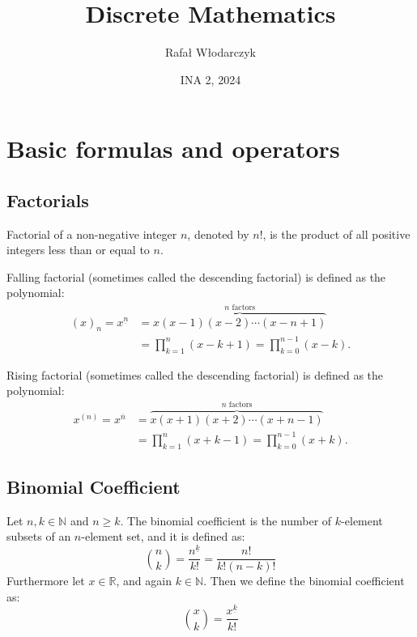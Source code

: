 \documentclass{article}
\title{Discrete Mathematics}
\author{Rafał Włodarczyk}
\date{INA 2, 2024}
\newenvironment{definition}[1]{%
    \trivlist
    \item[\hskip\labelsep\textbf{Definition. #1.}]
    \ignorespaces
}{%
    \endtrivlist
}
\begin{document}
\maketitle

\tableofcontents

\section{Basic formulas and operators}

\subsection{Factorials}

\begin{definition}{Factorial}
    Factorial of a non-negative integer $n$, denoted by $n!$, is the product of all positive integers less than or equal to $n$. 
\end{definition}

\begin{definition}{Falling Factorial}
     Falling factorial (sometimes called the descending factorial) is defined as the polynomial:
     $$
     \begin{aligned}
        (x)_{n}=x^{\underline {n}}&=\overbrace {x(x-1)(x-2)\cdots (x-n+1)} ^{n{\text{ factors}}}\\
        &=\prod _{k=1}^{n}(x-k+1)=\prod _{k=0}^{n-1}(x-k).
     \end{aligned}
     $$
\end{definition}

\begin{definition}{Rising Factorial}
    Rising factorial (sometimes called the descending factorial) is defined as the polynomial:
    $$
    \begin{aligned}
        x^{(n)}=x^{\overline {n}}&=\overbrace {x(x+1)(x+2)\cdots (x+n-1)} ^{n{\text{ factors}}}\\
        &=\prod _{k=1}^{n}(x+k-1)=\prod _{k=0}^{n-1}(x+k).
    \end{aligned}
    $$
\end{definition}

\subsection{Binomial Coefficient}

\begin{definition}{Binomial Coefficient}
    Let $n,k \in \mathbb{N}$ and $n\geq k$. The binomial coefficient is the number of $k$-element subsets of an $n$-element set, and it is defined as:
    \[\binom{n}{k}=\frac{n^{\underline{k}}}{k!}=\frac{n!}{k!(n-k)!}\]
    Furthermore let $x\in \mathbb{R}$, and again $k\in\mathbb{N}$. Then we define the binomial coefficient as:
    \[\binom{x}{k}=\frac{x^{\underline{k}}}{k!}\]
\end{definition}
\end{document}
